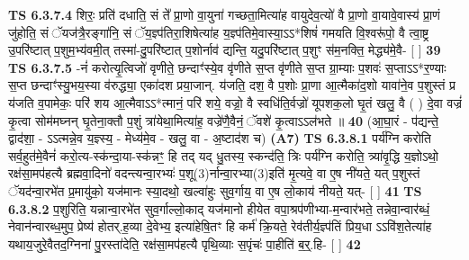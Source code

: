 \documentclass[17pt]{extarticle}
\begin{document}
                                \textbf{ TS 6.3.7.4} \newline
                  शिरः॒ प्रति॑ दधाति॒ सं ते᳚ प्रा॒णो वा॒युना॑ गच्छता॒मित्या॑ह वायुदेव॒त्यो॑ वै प्रा॒णो वा॒यावे॒वास्य॑ प्रा॒णं जु॑होति॒ सं ॅयज॑त्रै॒रङ्गा॑नि॒ सं ॅय॒ज्ञ्प॑तिरा॒शिषेत्या॑ह य॒ज्ञ्प॑तिमे॒वास्या॒ऽऽ*शिषं॑ गमयति वि॒श्वरू॑पो॒ वै त्वा॒ष्ट्र उ॒परि॑ष्टात् प॒शुम॒भ्य॑वमी॒त् तस्मा॑-दु॒परि॑ष्टात् प॒शोर्नाव॑ द्यन्ति॒ यदु॒परि॑ष्टात् प॒शुꣳ स॑म॒नक्ति॒ मेद्ध्य॑मे॒वै- [  ] \textbf{  39} \newline
                  \newline
                                \textbf{ TS 6.3.7.5} \newline
                  -नं॑ करोत्यृ॒त्विजो॑ वृणीते॒ छन्दाꣳ॑स्ये॒व वृ॑णीते स॒प्त वृ॑णीते स॒प्त ग्रा॒म्याः प॒शवः॑ स॒प्ताऽऽ*र॒ण्याः स॒प्त छन्दाꣳ॑स्यु॒भय॒स्या व॑रुद्ध्या॒ एका॑दश प्रया॒जान्. य॑जति॒ दश॒ वै प॒शोः प्रा॒णा आ॒त्मैका॑द॒शो यावा॑ने॒व प॒शुस्तं प्र य॑जति व॒पामेकः॒ परि॑ शय आ॒त्मैवाऽऽ*त्मानं॒ परि॑ शये॒ वज्रो॒ वै स्वधि॑ति॒र्वज्रो॑ यूपशक॒लो घृ॒तं खलु॒ वै ( )  दे॒वा वज्रं॑ कृ॒त्वा सोम॑मघ्नन् घृ॒तेना॒क्तौ प॒शुं त्रा॑येथा॒मित्या॑ह॒ वज्रे॑णै॒वैनं॒ ॅवशे॑ कृ॒त्वाऽऽल॑भते ॥ \textbf{  40} \newline
                  \newline
                      (आ॒घा॒रं - प॑द्यन्ते॒ द्वाद॑शा॒ - ऽऽत्मन्ने॒व य॒ज्ञ्स्य॒ - मेध्य॑मे॒व - खलु॒ वा - अ॒ष्टाद॑श च)  \textbf{(A7)} \newline \newline
                                        \textbf{ TS 6.3.8.1} \newline
                  पर्य॑ग्नि करोति सर्व॒हुत॑मे॒वैनं॑ करो॒त्य-स्क॑न्दा॒या-स्क॑न्नꣳ॒॒ हि तद् यद् धु॒तस्य॒ स्कन्द॑ति॒ त्रिः पर्य॑ग्नि करोति॒ त्र्या॑वृ॒द्धि य॒ज्ञोऽथो॒ रक्ष॑सा॒मप॑हत्यै ब्रह्मवा॒दिनो॑ वदन्त्यन्वा॒रभ्यः॑ प॒शू(3)र्नान्वा॒रभ्या(3)इति॑ मृ॒त्यवे॒ वा ए॒ष नी॑यते॒ यत् प॒शुस्तं ॅयद॑न्वा॒रभे॑त प्र॒मायु॑को॒ यज॑मानः स्या॒दथो॒ खल्वा॑हुः सुव॒र्गाय॒ वा ए॒ष लो॒काय॑ नीयते॒ यत्- [  ] \textbf{  41} \newline
                  \newline
                                \textbf{ TS 6.3.8.2} \newline
                  प॒शुरिति॒ यन्नान्वा॒रभे॑त सुव॒र्गाल्लो॒काद् यज॑मानो हीयेत वपा॒श्रप॑णीभ्या-म॒न्वार॑भते॒ तन्नेवा॒न्वार॑ब्धं॒ नेवान॑न्वारब्ध॒मुप॒ प्रेष्य॑ होतर्.ह॒व्या दे॒वेभ्य॒ इत्या॑हेषि॒तꣳ हि कर्म॑ क्रि॒यते॒ रेव॑तीर्य॒ज्ञ्प॑तिं प्रिय॒धा ऽऽवि॑श॒तेत्या॑ह यथाय॒जुरे॒वैतद॒ग्निना॑ पु॒रस्ता॑देति॒ रक्ष॑सा॒मप॑हत्यै पृथि॒व्याः स॒पृंचः॑ पा॒हीति॑ ब॒र्॒.हि- [  ] \textbf{  42} \newline
\end{document}
